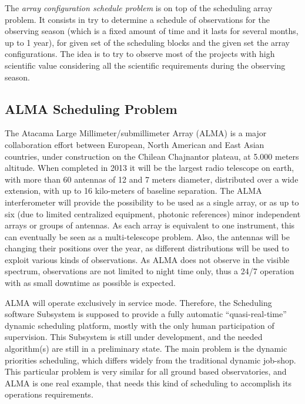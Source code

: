 \documentclass[11pt]{article}
\begin{document}
The \textit{array configuration schedule problem} is on top of the scheduling array problem. It consists in try to determine a schedule of observations for the observing season (which is a fixed amount of time and it lasts for several months, up to 1 year), for given set of the scheduling blocks and the given set the array configurations. The idea is to try to observe most of the projects with high scientific value considering all the scientific requirements during the observing season.

\subsection*{ALMA Scheduling Problem}
The Atacama Large Millimeter/submillimeter Array (ALMA) is a major collaboration effort between European, North American and East Asian countries, under construction on the Chilean Chajnantor plateau, at 5.000 meters altitude. When completed in 2013 it will be the largest radio telescope on earth, with more than 60 antennas of 12 and 7 meters diameter, distributed over a wide extension, with up to 16 kilo-meters of baseline separation. The ALMA interferometer will provide the possibility to be used as a single array, or as up to six (due to limited centralized equipment, photonic references) minor independent arrays or groups of antennas. As each array is equivalent to one instrument, this can eventually be seen as a multi-telescope problem. Also, the antennas will be changing their positions over the year, as different distributions will be used to exploit various kinds of observations. As ALMA does not observe in the visible spectrum, observations are not limited to night time only, thus a 24/7 operation with as small downtime as possible is expected. 

ALMA will operate exclusively in service mode. Therefore, the Scheduling software Subsystem is supposed to provide a fully automatic “quasi-real-time” dynamic scheduling platform, mostly with the only human participation of supervision. This Subsystem is still under development, and the needed algorithm(s) are still in a preliminary state. The main problem is the dynamic priorities scheduling, which differs widely from the traditional dynamic job-shop. This particular problem is very similar for all ground based observatories, and ALMA is one real example, that needs this kind of scheduling to accomplish its operations requirements.
\end{document}
